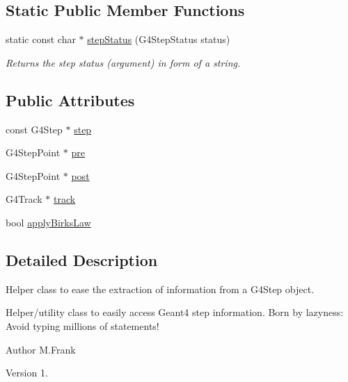 \subsection*{Static Public Member Functions}
\begin{DoxyCompactItemize}
\item 
static const char $\ast$ \hyperlink{class_d_d4hep_1_1_simulation_1_1_geant4_step_handler_a749fffe231a34f253d498edf989ae035}{step\+Status} (G4\+Step\+Status status)
\begin{DoxyCompactList}\small\item\em Returns the step status (argument) in form of a string. \end{DoxyCompactList}\end{DoxyCompactItemize}
\subsection*{Public Attributes}
\begin{DoxyCompactItemize}
\item 
const G4\+Step $\ast$ \hyperlink{class_d_d4hep_1_1_simulation_1_1_geant4_step_handler_a5f8ecf6b8e58ab857df4d639d9b8f235}{step}
\item 
G4\+Step\+Point $\ast$ \hyperlink{class_d_d4hep_1_1_simulation_1_1_geant4_step_handler_a7c18f2d6e46ecbb380fbe0995029accb}{pre}
\item 
G4\+Step\+Point $\ast$ \hyperlink{class_d_d4hep_1_1_simulation_1_1_geant4_step_handler_aed9081f8334e95c40e321c14621c0a35}{post}
\item 
G4\+Track $\ast$ \hyperlink{class_d_d4hep_1_1_simulation_1_1_geant4_step_handler_a8bb7d5d357693c499d319fdc1fa3b34b}{track}
\item 
bool \hyperlink{class_d_d4hep_1_1_simulation_1_1_geant4_step_handler_ae14ced51d527345a4efed73a39ecd1c0}{apply\+Birks\+Law}
\end{DoxyCompactItemize}


\subsection{Detailed Description}
Helper class to ease the extraction of information from a G4\+Step object. 

Helper/utility class to easily access Geant4 step information. Born by lazyness\+: Avoid typing millions of statements!

\begin{DoxyAuthor}{Author}
M.\+Frank 
\end{DoxyAuthor}
\begin{DoxyVersion}{Version}
1. 
\end{DoxyVersion}


